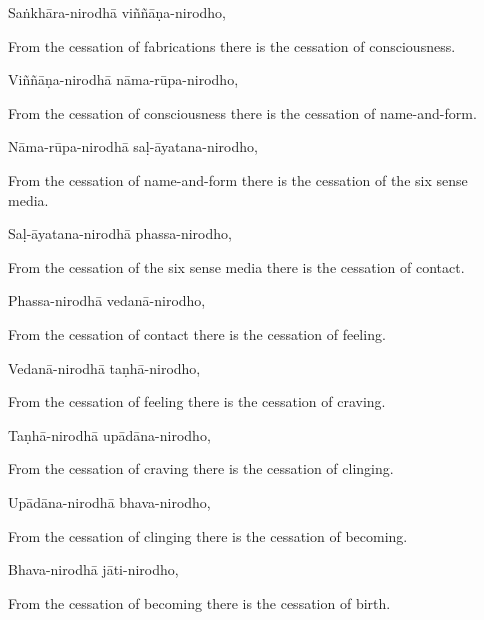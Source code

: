 Saṅkhāra-nirodhā viññāṇa-nirodho,

\begin{english}
  From the cessation of fabrications there is the cessation of consciousness.
\end{english}

Viññāṇa-nirodhā nāma-rūpa-nirodho,

\begin{english}
  From the cessation of consciousness there is the cessation of name-and-form.
\end{english}

Nāma-rūpa-nirodhā saḷ-āyatana-nirodho,

\begin{english}
  From the cessation of name-and-form there is the cessation of the six sense media.
\end{english}

Saḷ-āyatana-nirodhā phassa-nirodho,

\begin{english}
  From the cessation of the six sense media there is the cessation of contact.
\end{english}

Phassa-nirodhā vedanā-nirodho,

\begin{english}
  From the cessation of contact there is the cessation of feeling.
\end{english}

Vedanā-nirodhā taṇhā-nirodho,

\begin{english}
  From the cessation of feeling there is the cessation of craving.
\end{english}

Taṇhā-nirodhā upādāna-nirodho,

\begin{english}
  From the cessation of craving there is the cessation of clinging.
\end{english}

Upādāna-nirodhā bhava-nirodho,

\begin{english}
  From the cessation of clinging there is the cessation of becoming.
\end{english}

Bhava-nirodhā jāti-nirodho,

\begin{english}
  From the cessation of becoming there is the cessation of birth.
\end{english}

